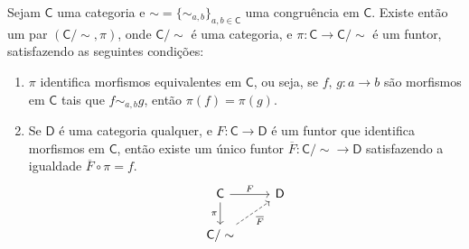 \begin{teo}\label{teo:existencia_categoria_quociente}
    Sejam $\mathsf{C}$ uma categoria e $\sim = \{\sim_{a,b}\}_{a,b \in \mathsf{C}}$ uma congruência em $\mathsf{C}$.
    Existe então um par $(\mathsf{C}/\sim,\pi)$, onde $\mathsf{C}/\sim$ é uma categoria, e $\pi: \mathsf{C} \to \mathsf{C}/\sim$ é um funtor, satisfazendo as seguintes condições:
    \begin{enumerate}
        \item $\pi$ identifica morfismos equivalentes em $\mathsf{C}$, ou seja, se $f,\,g: a \to b$ são morfismos em $\mathsf{C}$ tais que $f \sim_{a,b} g$, então $\pi(f) = \pi(g)$.

        \item Se $\mathsf{D}$ é uma categoria qualquer, e $F: \mathsf{C} \to \mathsf{D}$ é um funtor que identifica morfismos em $\mathsf{C}$, então existe um único funtor $\overline{F}: \mathsf{C}/\sim \to \mathsf{D}$ satisfazendo a igualdade $\overline{F} \circ \pi = f$.
        \begin{displaymath}
            \begin{tikzcd}
                \mathsf{C}
                \arrow[r, "F"]
                \arrow[d, "\pi" swap]
                & \mathsf{D}
                \\ \mathsf{C}/\sim
                \arrow[ru, dashed, "\overline{F}" swap]
            \end{tikzcd}
        \end{displaymath}
    \end{enumerate}
\end{teo}
